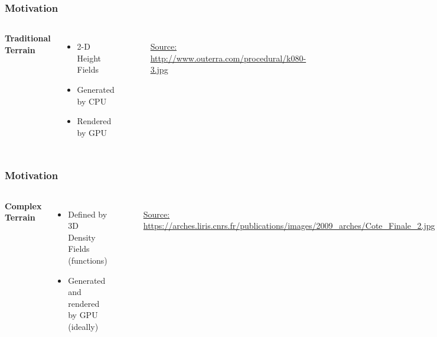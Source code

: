 \documentclass[12pt]{beamer}
\begin{document}
\begin{frame}
    \frametitle{Motivation}

    \begin{columns}[c] %

        \textbf{Traditional Terrain}
        \begin{itemize}
            \item 2-D Height Fields
            \item Generated by CPU
            \item Rendered by GPU
        \end{itemize}

            \begin{figure}
                \tiny{ \url{Source: http://www.outerra.com/procedural/k080-3.jpg}}
            \end{figure}


        \end{columns}


    \end{frame}


    \begin{frame}
        \frametitle{Motivation}

        \begin{columns}[c] %

            \textbf{Complex Terrain}
            \begin{itemize}
                \item Defined by 3D Density Fields (functions)  
                \item Generated and rendered by GPU (ideally) 
            \end{itemize}

            \begin{figure}
                \tiny{\url{Source: https://arches.liris.cnrs.fr/publications/images/2009_arches/Cote_Finale_2.jpg}}

            \end{figure}

            \end{columns}


        \end{frame}
\end{document}
